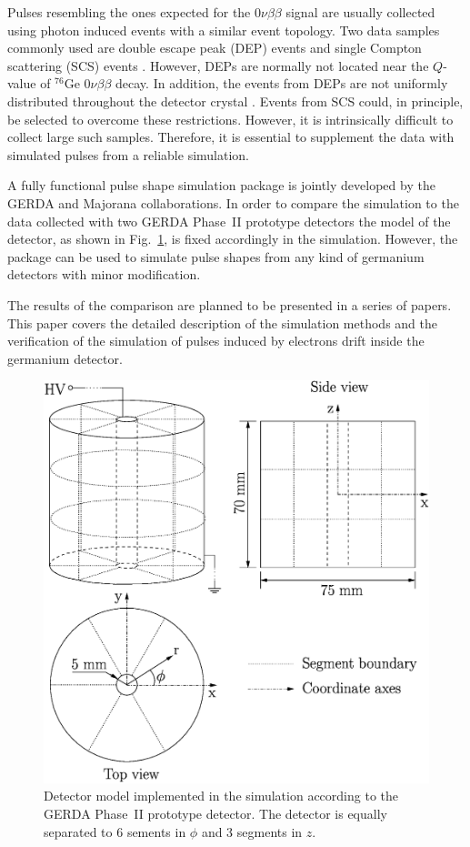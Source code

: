 \documentclass[epj]{svjour}
\begin{document}
Pulses resembling the ones expected for the $0\nu\beta\beta$ signal
are usually collected using photon induced events with a similar event
topology. Two data samples commonly used are double escape peak (DEP)
events and single Compton scattering (SCS) events \cite{scs}.
However, DEPs are normally not located near the $Q$-value of $^{76}$Ge
$0\nu\beta\beta$ decay. In addition, the events from DEPs are not
uniformly distributed throughout the detector crystal
\cite{psam}. Events from SCS could, in principle, be selected to
overcome these restrictions. However, it is intrinsically difficult to
collect large such samples. Therefore, it is essential to supplement
the data with simulated pulses from a reliable simulation.

A fully functional pulse shape simulation package is jointly developed
by the GERDA and Majorana \cite{Gai03,Aal04} collaborations. In order
to compare the simulation to the data collected with two GERDA
Phase~II prototype detectors the model of the detector, as shown in
Fig.~\ref{f:model}, is fixed accordingly in the simulation. However,
the package can be used to simulate pulse shapes from any kind of
germanium detectors with minor modification.

The results of the comparison are planned to be presented in a series
of papers. This paper covers the detailed description of the
simulation methods and the verification of the simulation of pulses
induced by electrons drift inside the germanium detector.

\begin{figure}[htbp]
\centering
\includegraphics[width=0.85\linewidth]{model}
\caption{Detector model implemented in the simulation according to the
GERDA Phase~II prototype detector. The detector is equally separated
to 6 sements in $\phi$ and 3 segments in $z$.}
\label{f:model}
\end{figure}
\end{document}
